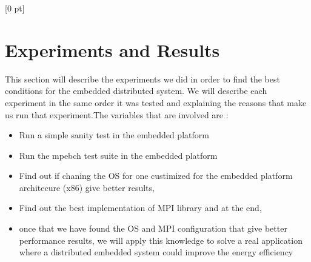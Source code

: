 \titlespacing{\chapter}{0 pt}{30 pt}{50 pt}[0 pt]
\titleformat{\section}{\Large\bfseries}{\thesection}{0 pt}{\hspace{30 pt}}
\titleformat{\subsection}{\large\bfseries}{\thesubsection}{0 pt}{\hspace{30 pt}}
\pagestyle{fancy}
\fancyhead[LO,LE]{\footnotesize\emph{\leftmark}}
\fancyhead[RO,RE]{\thepage}
\fancyfoot[CO,CE]{}

\chapter{Experiments and Results}

\normalsize
\noindent

This section will describe the experiments we did in order to find the best
conditions for the embedded distributed system. We will describe each
experiment in the same order it was tested and explaining the reasons that make
us run that experiment.The variables that are involved are : 

\begin{itemize}
\item Run a simple sanity test in the embedded platform
\item Run the mpebch test suite in the embedded platform
\item Find out if chaning the OS for one custimized for the embedded platform
architecure (x86) give better results,
\item Find out the best implementation of MPI library and at the end, 
\item once that we have found the OS and MPI configuration that give better
performance results, we will apply this knowledge to solve a real application
where a distributed embedded system could improve the energy efficiency
\end{itemize}

